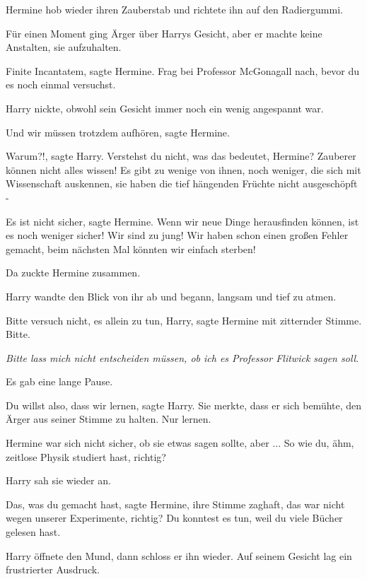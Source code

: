 Hermine hob wieder ihren Zauberstab und richtete ihn auf den Radiergummi.

Für einen Moment ging Ärger über Harrys Gesicht, aber er machte keine Anstalten,
sie aufzuhalten.

\glqq{}Finite Incantatem\grqq{}, sagte Hermine. \glqq{}Frag bei Professor
McGonagall nach, bevor du es noch einmal versuchst.\grqq{}

Harry nickte, obwohl sein Gesicht immer noch ein wenig angespannt war.

\glqq{}Und wir müssen trotzdem aufhören\grqq{}, sagte Hermine.

\glqq{}Warum?!\grqq{}, sagte Harry. \glqq{}Verstehst du nicht, was das bedeutet,
Hermine? Zauberer können nicht alles wissen! Es gibt zu wenige von ihnen, noch
weniger, die sich mit Wissenschaft auskennen, sie haben die tief hängenden
Früchte nicht ausgeschöpft -\grqq{}

\glqq{}Es ist nicht sicher\grqq{}, sagte Hermine. \glqq{}Wenn wir neue Dinge
herausfinden können, ist es noch weniger sicher! Wir sind zu jung! Wir haben
schon einen großen Fehler gemacht, beim nächsten Mal könnten wir einfach
sterben!\grqq{}

Da zuckte Hermine zusammen.

Harry wandte den Blick von ihr ab und begann, langsam und tief zu atmen.

\glqq{}Bitte versuch nicht, es allein zu tun, Harry\grqq{}, sagte Hermine mit
zitternder Stimme. \glqq{}Bitte.\grqq{}

\emph{Bitte lass mich nicht entscheiden müssen, ob ich es Professor Flitwick
sagen soll}.

Es gab eine lange Pause.

\glqq{}Du willst also, dass wir lernen\grqq{}, sagte Harry. Sie merkte, dass er
sich bemühte, den Ärger aus seiner Stimme zu halten. \glqq{}Nur lernen.\grqq{}

Hermine war sich nicht sicher, ob sie etwas sagen sollte, aber ... \glqq{}So wie
du, ähm, zeitlose Physik studiert hast, richtig?\grqq{}

Harry sah sie wieder an.

\glqq{}Das, was du gemacht hast\grqq{}, sagte Hermine, ihre Stimme zaghaft,
\glqq{}das war nicht wegen unserer Experimente, richtig? Du konntest es tun,
weil du viele Bücher gelesen hast.\grqq{}

Harry öffnete den Mund, dann schloss er ihn wieder. Auf seinem Gesicht lag ein
frustrierter Ausdruck.

